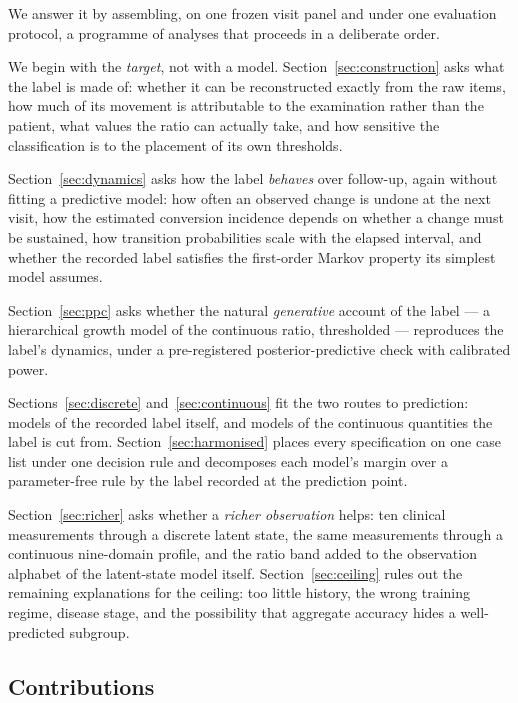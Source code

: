 \documentclass[11pt]{article}
\begin{document}
We answer it by assembling, on one frozen visit panel and under one evaluation
protocol, a programme of analyses that proceeds in a deliberate order.

We begin with the \emph{target}, not with a model. Section~\ref{sec:construction}
asks what the label is made of: whether it can be reconstructed exactly from the
raw items, how much of its movement is attributable to the examination rather
than the patient, what values the ratio can actually take, and how sensitive the
classification is to the placement of its own thresholds.

Section~\ref{sec:dynamics} asks how the label \emph{behaves} over follow-up,
again without fitting a predictive model: how often an observed change is undone
at the next visit, how the estimated conversion incidence depends on whether a
change must be sustained, how transition probabilities scale with the elapsed
interval, and whether the recorded label satisfies the first-order Markov
property its simplest model assumes.

Section~\ref{sec:ppc} asks whether the natural \emph{generative} account of the
label --- a hierarchical growth model of the continuous ratio, thresholded ---
reproduces the label's dynamics, under a pre-registered posterior-predictive
check with calibrated power.

Sections~\ref{sec:discrete} and~\ref{sec:continuous} fit the two routes to
prediction: models of the recorded label itself, and models of the continuous
quantities the label is cut from. Section~\ref{sec:harmonised} places every
specification on one case list under one decision rule and decomposes each
model's margin over a parameter-free rule by the label recorded at the
prediction point.

Section~\ref{sec:richer} asks whether a \emph{richer observation} helps: ten
clinical measurements through a discrete latent state, the same measurements
through a continuous nine-domain profile, and the ratio band added to the
observation alphabet of the latent-state model itself.
Section~\ref{sec:ceiling} rules out the remaining explanations for the ceiling:
too little history, the wrong training regime, disease stage, and the
possibility that aggregate accuracy hides a well-predicted subgroup.

\subsection{Contributions}
\end{document}
